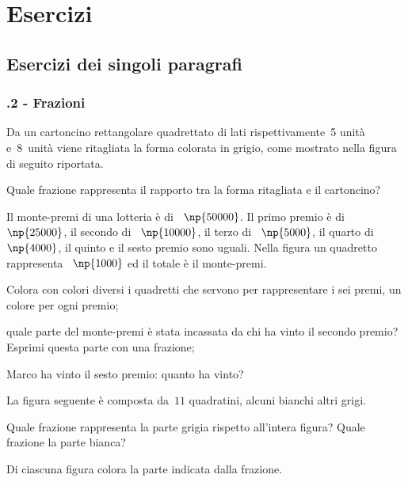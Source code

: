\section{Esercizi}
\subsection{Esercizi dei singoli paragrafi}
\subsubsection*{\thechapter.2 - Frazioni}

\begin{esercizio}[\Ast]
\label{ese:3.1}
Da un cartoncino rettangolare quadrettato di lati rispettivamente~5 unità e~8~unità viene ritagliata
la forma colorata in grigio, come mostrato nella figura di seguito riportata.
\begin{center}
 
\end{center}
Quale frazione rappresenta il rapporto tra la forma ritagliata e il cartoncino?
\end{esercizio}

\begin{esercizio}
\label{ese:3.2}
Il monte-premi di una lotteria è di \officialeuro~$\np{50000}$. Il primo premio è di \officialeuro~$\np{25000}$, il secondo di
\officialeuro~$\np{10000}$, il terzo di \officialeuro~$\np{5000}$, il quarto di \officialeuro~$\np{4000}$, il quinto e il sesto premio sono uguali.
Nella figura un quadretto rappresenta \officialeuro~$\np{1000}$ ed il totale è il monte-premi.
\begin{center}
 
\end{center}
\begin{enumeratea}
 \item Colora con colori diversi i quadretti che servono per rappresentare i sei premi, un colore per ogni premio;
 \item quale parte del monte-premi è stata incassata da chi ha vinto il secondo premio?
	Esprimi questa parte con una frazione;
 \item Marco ha vinto il sesto premio: quanto ha vinto?
\end{enumeratea}
\end{esercizio}

\begin{esercizio}[\Ast]
 \label{ese:3.3}
La figura seguente è composta da~$11$ quadratini, alcuni bianchi altri grigi.
\begin{center}
 
\end{center}
Quale frazione rappresenta la parte grigia rispetto all'intera figura? Quale frazione la parte bianca?
\end{esercizio}
\pagebreak
\begin{esercizio}
 \label{ese:3.4}
 Di ciascuna figura colora la parte indicata dalla frazione.
\begin{center}
 
\end{center}
\end{esercizio}

